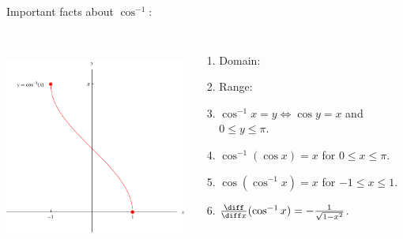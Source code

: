 \begin{frame}
Important facts about $\cos^{-1}$:
\begin{columns}[c]
\ \includegraphics[height=6cm]{inverse-trig/pictures/07-06-arccosd.pdf}%
\begin{enumerate}
\item  \alert<handout:0| 2-3>{Domain: }
\item  \alert<handout:0| 4-5>{Range: }
\item  $\cos^{-1} x = y \Leftrightarrow \cos y = x$ and $0 \leq y \leq \pi$.
\item  $\cos^{-1} (\cos x) = x$ for $0 \leq x \leq \pi$.
\item  $\cos (\cos^{-1} x) = x$ for $-1 \leq x \leq 1$.
\item  $\frac{\diff}{\diff x} (\cos^{-1} x) = -\frac{1}{\sqrt{1-x^2}}$.  
\end{enumerate}
\end{columns}
\end{frame}
